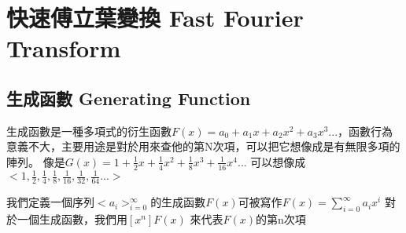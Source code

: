 

\section{快速傅立葉變換 Fast Fourier Transform}

\subsection{生成函數 Generating Function}
\label{sec:fft:gf}

生成函數是一種多項式的衍生函數$F\left(x\right)=a_0+a_1x+a_2x^2+a_3x^3...$，函數行為意義不大，主要用途是對於用來查他的第N次項，可以把它想像成是有無限多項的陣列。
像是$G\left(x\right)=1+\frac 1 2x+\frac 1 4x^2+\frac 1 8x^3+\frac 1 {16}x^4...$ 可以想像成$<1,\frac 1 2,\frac 1 4,\frac 1 8,\frac 1 {16},\frac 1 {32},\frac 1 {64}...>$

\begin{definition}
我們定義一個序列$<a_i>_{i=0}^\infty$的生成函數$F\left(x\right)$可被寫作$F\left(x\right)=\sum_{i=0}^{\infty}a_ix^i$
對於一個生成函數，我們用$[x^n]F\left( x\right)$ 來代表$F\left(x\right)$的第n次項
\end{definition}

